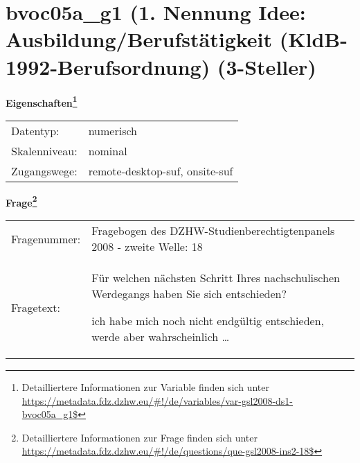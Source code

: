 
    \setcounter{footnote}{0}

    \vspace*{-1.8cm}
	\section{bvoc05a\_g1 (1. Nennung Idee: Ausbildung/Berufstätigkeit (KldB-1992-Berufsordnung) (3-Steller)}
	\label{section:bvoc05a_g1}



    \vspace*{0.5cm}
    \noindent\textbf{Eigenschaften\footnote{Detailliertere Informationen zur Variable finden sich unter
		\url{https://metadata.fdz.dzhw.eu/\#!/de/variables/var-gsl2008-ds1-bvoc05a_g1$}}}\\
	\begin{tabularx}{\hsize}{@{}lX}
	Datentyp: & numerisch \\
	Skalenniveau: & nominal \\
	Zugangswege: &
	  remote-desktop-suf, 
	  onsite-suf
 \\
    \end{tabularx}



				\vspace*{0.5cm}
                \noindent\textbf{Frage\footnote{Detailliertere Informationen zur Frage finden sich unter
		              \url{https://metadata.fdz.dzhw.eu/\#!/de/questions/que-gsl2008-ins2-18$}}}\\
				\begin{tabularx}{\hsize}{@{}lX}
					Fragenummer: &
					  Fragebogen des DZHW-Studienberechtigtenpanels 2008 - zweite Welle:
					  18
 \\
					Fragetext: & Für welchen nächsten Schritt Ihres nachschulischen Werdegangs haben Sie sich entschieden?\par  ich habe mich noch nicht endgültig entschieden, werde aber wahrscheinlich … \\
				\end{tabularx}





